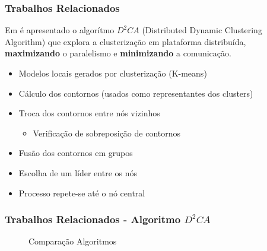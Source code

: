 \documentclass[hyperref={pdfpagelabels=false}]{beamer}
\begin{document}
\begin{frame}
	\frametitle{Trabalhos Relacionados}
    Em \cite{017-000} é apresentado o algorítmo $D^{2}CA$ (Distributed Dynamic Clustering Algorithm) que explora a clusterização em plataforma distribuída, \textbf{maximizando} o paralelismo e \textbf{minimizando} a comunicação. 
    \begin{itemize}
	    \item Modelos locais gerados por clusterização (K-means)
        \item Cálculo dos contornos (usados como representantes dos clusters)
        \item Troca dos contornos entre nós vizinhos \begin{itemize}
	        \item Verificação de sobreposição de contornos
        \end{itemize}
        \item Fusão dos contornos em grupos
        \item Escolha de um líder entre os nós
        \item Processo repete-se até o nó central
    \end{itemize}

\end{frame}

\begin{frame}
	\frametitle{Trabalhos Relacionados - Algoritmo $D^{2}CA$}
    
    \begin{figure}
    
     \hfill
     \hfill

     \caption{Comparação Algoritmos \cite{017-000}}
     \end{figure}
     
\end{frame}
\end{document}

